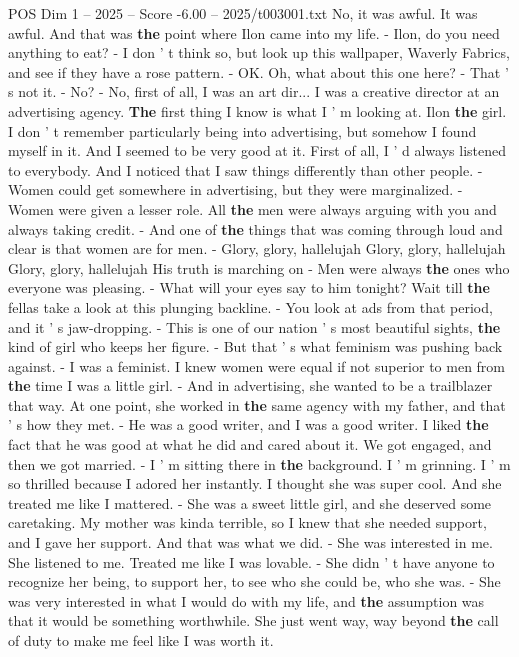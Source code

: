 \begin{textsample}{POS Dim 1 – 2025 – Score -6.00 – 2025/t003001.txt}
No, it was awful.
It was awful.
And that was \textbf{the} point where Ilon came into my life. - Ilon, do you need anything to eat? - I don ' t think so, but look up this wallpaper, Waverly Fabrics, and see if they have a rose pattern. - OK.
Oh, what about this one here? - That ' s not it. - No? - No, first of all, I was an art dir...
I was a creative director at an advertising agency. \textbf{The} first thing I know is what I ' m looking at.
Ilon \textbf{the} girl.
I don ' t remember particularly being into advertising, but somehow I found myself in it.
And I seemed to be very good at it.
First of all, I ' d always listened to everybody.
And I noticed that I saw things differently than other people. - Women could get somewhere in advertising, but they were marginalized. - Women were given a lesser role.
All \textbf{the} men were always arguing with you and always taking credit. - And one of \textbf{the} things that was coming through loud and clear is that women are for men. - Glory, glory, hallelujah Glory, glory, hallelujah Glory, glory, hallelujah His truth is marching on - Men were always \textbf{the} ones who everyone was pleasing. - What will your eyes say to him tonight?
Wait till \textbf{the} fellas take a look at this plunging backline. - You look at ads from that period, and it ' s jaw-dropping. - This is one of our nation ' s most beautiful sights, \textbf{the} kind of girl who keeps her figure. - But that ' s what feminism was pushing back against. - I was a feminist.
I knew women were equal if not superior to men from \textbf{the} time I was a little girl. - And in advertising, she wanted to be a trailblazer that way.
At one point, she worked in \textbf{the} same agency with my father, and that ' s how they met. - He was a good writer, and I was a good writer.
I liked \textbf{the} fact that he was good at what he did and cared about it.
We got engaged, and then we got married. - I ' m sitting there in \textbf{the} background.
I ' m grinning.
I ' m so thrilled because I adored her instantly.
I thought she was super cool.
And she treated me like I mattered. - She was a sweet little girl, and she deserved some caretaking.
My mother was kinda terrible, so I knew that she needed support, and I gave her support.
And that was what we did. - She was interested in me.
She listened to me.
Treated me like I was lovable. - She didn ' t have anyone to recognize her being, to support her, to see who she could be, who she was. - She was very interested in what I would do with my life, and \textbf{the} assumption was that it would be something worthwhile.
She just went way, way beyond \textbf{the} call of duty to make me feel like I was worth it.

\end{textsample}
